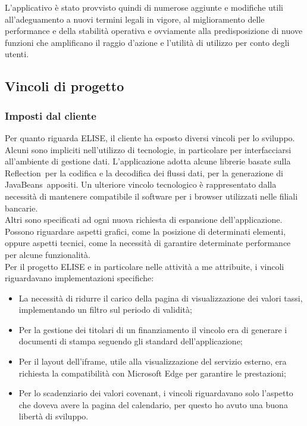 	L'applicativo è stato provvisto quindi di numerose aggiunte e modifiche utili all'adeguamento a nuovi termini legali in vigore, al miglioramento delle performance e della stabilità operativa e ovviamente alla predisposizione di nuove funzioni che amplificano il raggio d'azione e l'utilità di utilizzo per conto degli utenti.
	
	\subsection{Vincoli di progetto}

	\subsubsection{Imposti dal cliente}	
	Per quanto riguarda ELISE, il cliente ha esposto diversi vincoli per lo sviluppo.\\
	
	Alcuni sono impliciti nell'utilizzo di tecnologie, in particolare per interfacciarsi all'ambiente di gestione dati. L'applicazione adotta alcune librerie basate sulla Reflection\glossario\ per la codifica e la decodifica dei flussi dati, per la generazione di JavaBeans\glossario\ appositi. Un ulteriore vincolo tecnologico è rappresentato dalla necessità di mantenere compatibile il software per i browser utilizzati nelle filiali bancarie.\\
	
	Altri sono specificati ad ogni nuova richiesta di espansione dell'applicazione. Possono riguardare aspetti grafici, come la posizione di determinati elementi, oppure aspetti tecnici, come la necessità di garantire determinate performance per alcune funzionalità.\\
	
	Per il progetto ELISE e in particolare nelle attività a me attribuite, i vincoli riguardavano implementazioni specifiche:
	\begin{itemize}
		\item La necessità di ridurre il carico della pagina di visualizzazione dei valori tassi, implementando un filtro sul periodo di validità;
		\item Per la gestione dei titolari di un finanziamento il vincolo era di generare i documenti di stampa seguendo gli standard dell'applicazione;
		\item Per il layout dell'iframe\glossario , utile alla visualizzazione del servizio esterno, era richiesta la compatibilità con Microsoft Edge per garantire le prestazioni;
		\item Per lo scadenziario dei valori covenant\glossario , i vincoli riguardavano solo l'aspetto che doveva avere la pagina del calendario, per questo ho avuto una buona libertà di sviluppo.
	\end{itemize}

